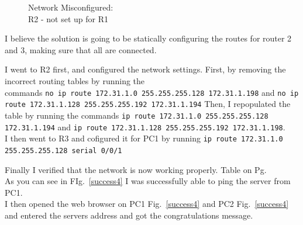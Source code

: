 \documentclass[../EngineeringJournal_CDavis.tex]{subfiles}
\begin{document}
\begin{figure}[!hbt]\centering
{}\par
\caption{Network Misconfigured:\\ R2 - not set up for R1}\label{misconfig4}
\end{figure}




I believe the solution is going to be statically configuring the routes for router 2 and 3, making sure that all are connected.


I went to R2 first, and configured the network settings. First, by removing the
incorrect routing tables by running the 
\\commands {\scriptsize{\verb$no ip route 172.31.1.0 255.255.255.128 172.31.1.198$}\normalsize} and {\scriptsize{\verb$no ip route 172.31.1.128 255.255.255.192 172.31.1.194$}\normalsize}  Then, I repopulated the table by running the 
commands {\scriptsize{\verb$ip route 172.31.1.0 255.255.255.128 172.31.1.194$}\normalsize} and 
{\scriptsize{\verb$ip route 172.31.1.128 255.255.255.192 172.31.1.198$}\normalsize}.\\ 
I then went to R3 and cofigured it for PC1 by running {\scriptsize{\verb$ip route 172.31.1.0 255.255.255.128 serial 0/0/1$}\normalsize} 


Finally I verified that the network is now working properly. Table on
Pg.~\pageref{success4}\\
As you can see in FIg.~\ref{success4} I was
successfully able to ping the server from PC1.\\
I then opened the web browser on PC1 Fig.~\ref{success4} and PC2
Fig.~\ref{success4} and entered the servers
address and got the congratulations message.
\end{document}
